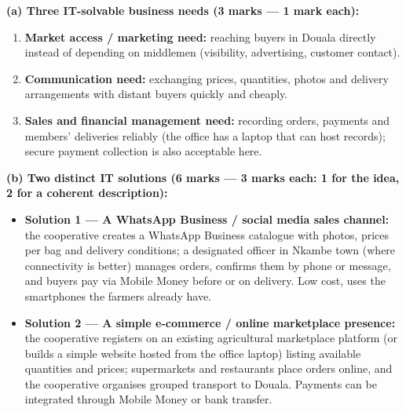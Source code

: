 \documentclass[11pt]{article}
\begin{document}
\begin{corrige}
\textbf{(a) Three IT-solvable business needs (3 marks — 1 mark each):}
\begin{enumerate}
\item \textbf{Market access / marketing need:} reaching buyers in Douala directly instead of depending on middlemen (visibility, advertising, customer contact).
\item \textbf{Communication need:} exchanging prices, quantities, photos and delivery arrangements with distant buyers quickly and cheaply.
\item \textbf{Sales and financial management need:} recording orders, payments and members' deliveries reliably (the office has a laptop that can host records); secure payment collection is also acceptable here.
\end{enumerate}

\textbf{(b) Two distinct IT solutions (6 marks — 3 marks each: 1 for the idea, 2 for a coherent description):}
\begin{itemize}
\item \textbf{Solution 1 — A WhatsApp Business / social media sales channel:} the cooperative creates a WhatsApp Business catalogue with photos, prices per bag and delivery conditions; a designated officer in Nkambe town (where connectivity is better) manages orders, confirms them by phone or message, and buyers pay via Mobile Money before or on delivery. Low cost, uses the smartphones the farmers already have.
\item \textbf{Solution 2 — A simple e-commerce / online marketplace presence:} the cooperative registers on an existing agricultural marketplace platform (or builds a simple website hosted from the office laptop) listing available quantities and prices; supermarkets and restaurants place orders online, and the cooperative organises grouped transport to Douala. Payments can be integrated through Mobile Money or bank transfer.
\end{itemize}


\end{corrige}
\end{document}
